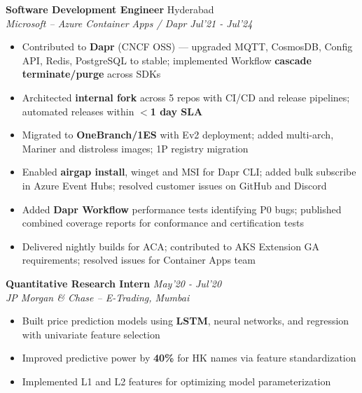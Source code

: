 \documentclass[9pt]{extarticle}
\newcommand{\cventry}[4]{
  {\small \textbf{#1}} \hfill {\footnotesize #3} \\[-1.5pt]
  {\small \emph{#2}} \hfill {\footnotesize \emph{#4}}
}
\newcommand{\cventrycompact}[3]{
  {\small \textbf{#1}} \hfill {\footnotesize \emph{#3}} \\[-1.5pt]
  {\small \emph{#2}}
}
\begin{document}
\begin{minipage}[t]{0.485\textwidth}
\cventry{Software Development Engineer}
{Microsoft -- Azure Container Apps / Dapr}
{Hyderabad}{Jul'21 - Jul'24}
\vspace{0.5mm}
\begin{itemize}
  \item Contributed to \textbf{Dapr} (CNCF OSS) ---
    upgraded MQTT, CosmosDB, Config API, Redis,
    PostgreSQL to stable; implemented Workflow
    \textbf{cascade terminate/purge} across SDKs
  \item Architected \textbf{internal fork} across 5
    repos with CI/CD and release pipelines;
    automated releases within \textbf{$<$1 day SLA}
  \item Migrated to \textbf{OneBranch/1ES} with Ev2
    deployment; added multi-arch, Mariner and
    distroless images; 1P registry migration
  \item Enabled \textbf{airgap install}, winget and
    MSI for Dapr CLI; added bulk subscribe in
    Azure Event Hubs; resolved customer issues
    on GitHub and Discord
  \item Added \textbf{Dapr Workflow} performance
    tests identifying P0 bugs; published combined
    coverage reports for conformance and
    certification tests
  \item Delivered nightly builds for ACA;
    contributed to AKS Extension GA requirements;
    resolved issues for Container Apps team
\end{itemize}

\vspace{3mm}

\cventrycompact{Quantitative Research Intern}
{JP Morgan \& Chase -- E-Trading, Mumbai}
{May'20 - Jul'20}
\vspace{0.5mm}
\begin{itemize}
  \item Built price prediction models using
    \textbf{LSTM}, neural networks, and regression
    with univariate feature selection
  \item Improved predictive power by \textbf{40\%}
    for HK names via feature standardization
  \item Implemented L1 and L2 features for
    optimizing model parameterization
\end{itemize}

\end{minipage}
\hfill
\end{document}
